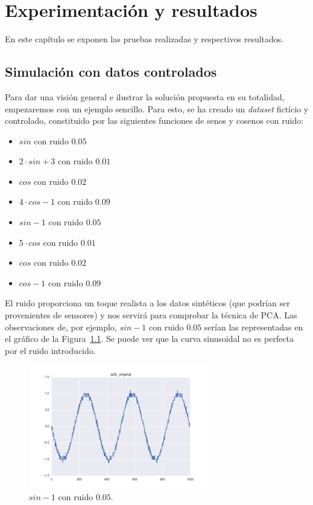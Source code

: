 \documentclass[11pt,spanish,listoffigures,listoftables]{tfgetsinf}
\begin{document}
\chapter{Experimentación y resultados}
En este capítulo se exponen las pruebas realizadas y respectivos resultados. 

    \section{Simulación con datos controlados}
    Para dar una visión general e ilustrar la solución propuesta en su totalidad, empezaremos con un ejemplo sencillo. Para esto, se ha creado un {\em dataset} fictício y controlado, constituido por las siguientes funciones de senos y cosenos con ruido:
    \begin{itemize}
        \item \(sin\) con ruido \(0.05\)
        \item \(2\cdot sin + 3\) con ruido \(0.01\)
        \item \(cos\) con ruido \(0.02\)
        \item \(4\cdot cos-1\) con ruido \(0.09\)
        \item \(sin - 1\) con ruido \(0.05\)
        \item \(5\cdot cos\) con ruido \(0.01\)
        \item \(cos\) con ruido \(0.02\)
        \item \(cos - 1\) con ruido \(0.09\)
    \end{itemize}
    
    El ruido proporciona un toque realista a los datos sintéticos (que podrían ser provenientes de sensores) y nos servirá para comprobar la técnica de PCA. Las observaciones de, por ejemplo, \(sin - 1\) con ruido \(0.05\) serían las representadas en el gráfico de la Figura~\ref{fig:col5_original}. Se puede ver que la curva sinusoidal no es perfecta por el ruido introducido.
    
    \begin{figure}[H]
        \centering
        \includegraphics[width=0.7\textwidth]{simulated_data_8_columns/col5_original.png}
        \caption{\(sin - 1\) con ruido \(0.05\).}
        \label{fig:col5_original}
    \end{figure}
\end{document}
